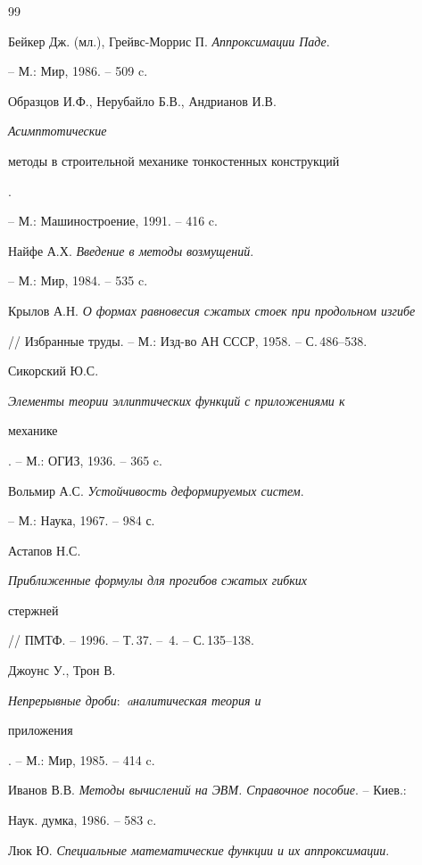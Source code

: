 \begin{thebibliography}{99}







Бейкер Дж. (мл.), Грейвс-Моррис П. {\em Аппроксимации Паде}.


-- М.: Мир, 1986. -- 509 c. 




Образцов И.Ф., Нерубайло Б.В., Андрианов И.В. {\em Асимптотические 


методы в строительной механике тонкостенных конструкций}. 


-- М.: Машиностроение, 1991. -- 416 c. 




Найфе А.Х. {\em Введение в методы возмущений}.


-- М.: Мир, 1984. -- 535 c. 




Крылов А.Н. {\em О формах равновесия сжатых стоек при продольном изгибе} 


// Избранные труды. -- М.: Изд-во АН СССР, 1958. -- С.\,486--538. 




Сикорский Ю.С. {\em Элементы теории эллиптических функций с приложениями к 


механике}. -- М.: ОГИЗ, 1936. -- 365 c.  




Вольмир А.С. {\em Устойчивость деформируемых систем}.


-- М.: Наука, 1967. -- 984 с. 




Астапов Н.С. {\em Приближенные формулы для прогибов сжатых гибких


стержней} // ПМТФ. -- 1996. -- Т.\,37. -- \No\,4. -- С.\,135--138. 




Джоунс У., Трон В. {\em Непрерывные дроби${:}$ aналитическая теория и 


приложения}. -- М.: Мир, 1985. -- 414 c. 




Иванов В.В. {\em Методы вычислений на ЭВМ. Справочное пособие}. -- Киев.: 


Наук. думка, 1986. -- 583 c. 




Люк Ю. {\em Специальные математические функции и их аппроксимации}.



\end{thebibliography}

